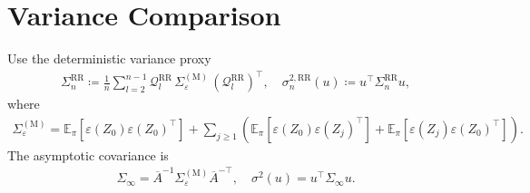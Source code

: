 
\section{Variance Comparison}

Use the deterministic variance proxy
\begin{equation}
\begin{aligned}
\Sigma_n^{\text{RR}} \coloneqq \frac{1}{n} \sum_{l = 2}^{n - 1}
  \mathcal{Q}_l^{\text{RR}} \, \Sigma_{\varepsilon}^{(\text{M})} \, (\mathcal{Q}_l^{\text{RR}})^\top,
\quad
\sigma_n^{2, \text{RR}}(u) \coloneqq u^\top \Sigma_n^{\text{RR}} u,
\end{aligned}
\end{equation}
where
\begin{equation}
\begin{aligned}
\Sigma_{\varepsilon}^{(\text{M})}
  = \mathbb{E}_\pi [\varepsilon(Z_0) \varepsilon(Z_0)^\top]
    + \sum_{j \ge 1} \left(
        \mathbb{E}_\pi [\varepsilon(Z_0) \varepsilon(Z_j)^\top]
        + \mathbb{E}_\pi [\varepsilon(Z_j) \varepsilon(Z_0)^\top]
      \right).
\end{aligned}
\end{equation}
The asymptotic covariance is
\begin{equation}
\begin{aligned}
\Sigma_\infty = \overline{A}^{-1} \Sigma_{\varepsilon}^{(\text{M})} \overline{A}^{-\top},
\quad
\sigma^2(u) = u^\top \Sigma_\infty u.
\end{aligned}
\end{equation}

